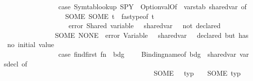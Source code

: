 \begin{isabellebody}
\ \ \ \ \ \ \ \ \ \ \ \ \ \ \ \ case\ Symtab{\isachardot}{\kern0pt}lookup\ {\isacharparenleft}{\kern0pt}{\isacharbang}{\kern0pt}SPY\ {\isacharbar}{\kern0pt}{\isachargreater}{\kern0pt}\ Option{\isachardot}{\kern0pt}valOf\ {\isacharbar}{\kern0pt}{\isachargreater}{\kern0pt}\ {\isacharhash}{\kern0pt}varstab{\isacharparenright}{\kern0pt}\ shared{\isacharunderscore}{\kern0pt}var\ of\isanewline
\ \ \ \ \ \ \ \ \ \ \ \ \ \ \ \ \ \ SOME\ {\isacharparenleft}{\kern0pt}SOME\ t{\isacharparenright}{\kern0pt}\ {\isacharequal}{\kern0pt}{\isachargreater}{\kern0pt}\ fastype{\isacharunderscore}{\kern0pt}of\ t\isanewline
\ \ \ \ \ \ \ \ \ \ \ \ \ \ \ \ {\isacharbar}{\kern0pt}\ {\isacharunderscore}{\kern0pt}\ {\isacharequal}{\kern0pt}{\isachargreater}{\kern0pt}\ error\ {\isacharparenleft}{\kern0pt}{\isachardoublequote}{\kern0pt}Shared\ variable\ {\isachardoublequote}{\kern0pt}\ {\isacharcircum}{\kern0pt}\ shared{\isacharunderscore}{\kern0pt}var\ {\isacharcircum}{\kern0pt}\ {\isachardoublequote}{\kern0pt}\ not\ declared{\isachardoublequote}{\kern0pt}{\isacharparenright}{\kern0pt}\isanewline
\ \ \ \ \ \ \ \ \ \ \ \ \ \ {\isacharbar}{\kern0pt}\ SOME\ NONE\ {\isacharequal}{\kern0pt}{\isachargreater}{\kern0pt}\ error\ {\isacharparenleft}{\kern0pt}{\isachardoublequote}{\kern0pt}Variable\ {\isachardoublequote}{\kern0pt}\ {\isacharcircum}{\kern0pt}\ shared{\isacharunderscore}{\kern0pt}var\ {\isacharcircum}{\kern0pt}\ {\isachardoublequote}{\kern0pt}\ declared\ but\ has\ no\ initial\ value{\isachardoublequote}{\kern0pt}{\isacharparenright}{\kern0pt}{\isacharasterisk}{\kern0pt}{\isacharparenright}{\kern0pt}\isanewline
\ \ \ \ \ \ \ \ \ \ \ \ \ \ \ \ case\ find{\isacharunderscore}{\kern0pt}first\ {\isacharparenleft}{\kern0pt}fn\ {\isacharparenleft}{\kern0pt}\ bdg{\isacharprime}{\kern0pt}{\isacharcomma}{\kern0pt}\ {\isacharunderscore}{\kern0pt}{\isacharcomma}{\kern0pt}\ {\isacharunderscore}{\kern0pt}{\isacharcomma}{\kern0pt}\ {\isacharunderscore}{\kern0pt}{\isacharparenright}{\kern0pt}\ {\isacharequal}{\kern0pt}{\isachargreater}{\kern0pt}\ Binding{\isachardot}{\kern0pt}name{\isacharunderscore}{\kern0pt}of\ bdg{\isacharprime}{\kern0pt}\ {\isacharequal}{\kern0pt}\ shared{\isacharunderscore}{\kern0pt}var{\isacharparenright}{\kern0pt}\ vars{\isacharunderscore}{\kern0pt}decl\ of\isanewline
\ \ \ \ \ \ \ \ \ \ \ \ \ \ \ \ \ \ \ \ \ \ \ \ \ \ \ \ \ \ \ \ \ \ \ \ \ \ \ \ \ \ \ \ SOME\ {\isacharparenleft}{\kern0pt}\ {\isacharunderscore}{\kern0pt}{\isacharcomma}{\kern0pt}\ typ{\isacharcomma}{\kern0pt}\ {\isacharunderscore}{\kern0pt}{\isacharcomma}{\kern0pt}\ {\isacharunderscore}{\kern0pt}{\isacharparenright}{\kern0pt}\ {\isacharequal}{\kern0pt}{\isachargreater}{\kern0pt}\ SOME\ typ\isanewline

\end{isabellebody}
